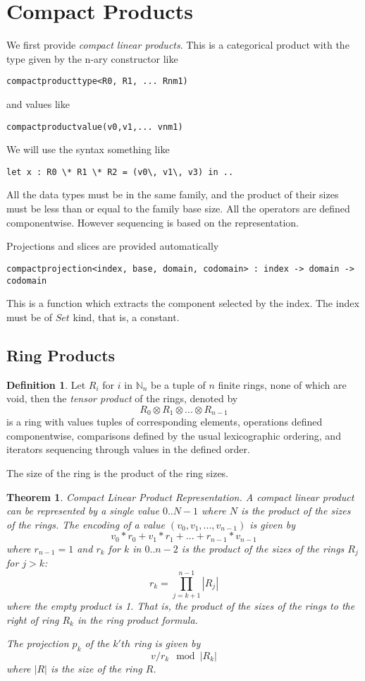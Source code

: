 \documentclass[oneside]{book}
\theoremstyle{plain}
\theoremstyle{definition}
\newtheorem{definition}{Definition}
\theoremstyle{plain}
\newtheorem{theorem}{Theorem}
\begin{document}
\section{Compact Products}
We first provide {\em compact linear products}. This is a categorical product
with the type given by the n-ary constructor like
\begin{verbatim}
compactproducttype<R0, R1, ... Rnm1)
\end{verbatim}
and values like
\begin{verbatim}
compactproductvalue(v0,v1,... vnm1)
\end{verbatim}
We will use the syntax something like
\begin{verbatim}
let x : R0 \* R1 \* R2 = (v0\, v1\, v3) in ..
\end{verbatim}


All the data types must be in the same family, and the product
of their sizes must be less than or equal to the family base size.
All the operators are defined componentwise. However sequencing
is based on the representation.

Projections and slices are provided automatically
\begin{verbatim}
compactprojection<index, base, domain, codomain> : index -> domain -> codomain
\end{verbatim}
This is a function which extracts the component selected
by the index. The index must be of $Set$ kind, that is, a constant.

\subsection{Ring Products}
\begin{definition}
Let $R_i$ for $i$ in $\mathbb{N}_n$ be a tuple of $n$ finite rings, none of which are void,
then the {\em tensor product} of the rings, denoted by
$$R_0 \otimes R_1 \otimes ... \otimes R_{n-1}$$
is a ring with values tuples of corresponding elements, operations
defined componentwise, comparisons defined by the usual lexicographic
ordering, and iterators sequencing through values in the defined order.
\end{definition}
The size of the ring is the product of the ring sizes.

\begin{theorem} {\em Compact Linear Product Representation}.
A compact linear product can be represented by a single value
$0..{N-1}$ where $N$ is the product of the sizes of the rings.
The encoding of a value $(v_0, v_1, ... ,v_{n-1})$ is given by
$$v_0 * r_0 + v_1 * r_1 + ... + r_{n-1} * v_{n-1}$$
where $r_{n-1}=1$ and $r_k$ for $k$ in $0..n-2$ is the product of the sizes of the rings
$R_j$ for $j>k$:
$$r_k = \prod_{j=k+1}^{n-1} |R_j|$$
where the empty product is 1. That is, the product of the sizes of the rings
to the {\em right} of ring $R_k$ in the ring product formula.

The projection $p_k$ of the $k'th$ ring is given by $$v / r_k \mod |R_k|$$
where $|R|$ is the size of the ring $R$.
\end{theorem}
\end{document}
